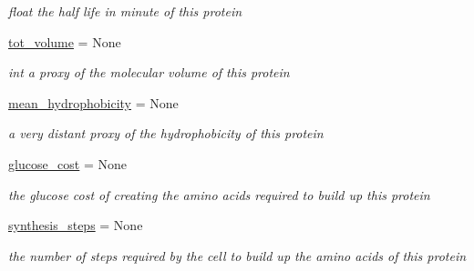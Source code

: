 \begin{DoxyCompactItemize}
\begin{DoxyCompactList}\small\item\em float the half life in minute of this protein \end{DoxyCompactList}\item 
\mbox{\label{class_py_c_u_b_1_1homology_1_1homology_a7b73b4cd404f7432302ce682970c04c1}} 
\mbox{\hyperlink{class_py_c_u_b_1_1homology_1_1homology_a7b73b4cd404f7432302ce682970c04c1}{tot\+\_\+volume}} = None
\begin{DoxyCompactList}\small\item\em int a proxy of the molecular volume of this protein \end{DoxyCompactList}\item 
\mbox{\label{class_py_c_u_b_1_1homology_1_1homology_a2fcdeaac4c8dcda15c2faaa26d565c2b}} 
\mbox{\hyperlink{class_py_c_u_b_1_1homology_1_1homology_a2fcdeaac4c8dcda15c2faaa26d565c2b}{mean\+\_\+hydrophobicity}} = None
\begin{DoxyCompactList}\small\item\em a very distant proxy of the hydrophobicity of this protein \end{DoxyCompactList}\item 
\mbox{\label{class_py_c_u_b_1_1homology_1_1homology_a3935ee71c6588e71ed71ca843dabb275}} 
\mbox{\hyperlink{class_py_c_u_b_1_1homology_1_1homology_a3935ee71c6588e71ed71ca843dabb275}{glucose\+\_\+cost}} = None
\begin{DoxyCompactList}\small\item\em the glucose cost of creating the amino acids required to build up this protein \end{DoxyCompactList}\item 
\mbox{\label{class_py_c_u_b_1_1homology_1_1homology_af6987d4b9223fb55cfe60e0456478b71}} 
\mbox{\hyperlink{class_py_c_u_b_1_1homology_1_1homology_af6987d4b9223fb55cfe60e0456478b71}{synthesis\+\_\+steps}} = None
\begin{DoxyCompactList}\small\item\em the number of steps required by the cell to build up the amino acids of this protein \end{DoxyCompactList}\item 

\end{DoxyCompactItemize}
